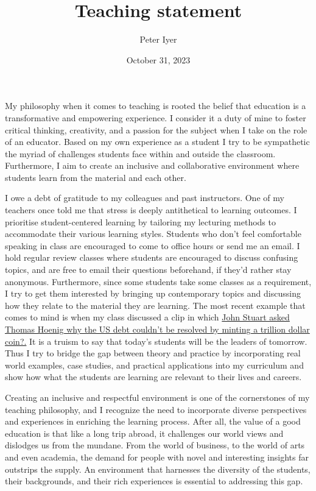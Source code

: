 \documentclass[
]{article}
\title{Teaching statement}
\author{Peter Iyer}
\date{October 31, 2023}
\begin{document}
\maketitle

My philosophy when it comes
to teaching is rooted the belief that education is a transformative and
empowering experience. I consider it a duty of mine to foster critical
thinking, creativity, and a passion for the subject when I take on the
role of an educator. Based on my own experience as a student I try to be
sympathetic the myriad of challenges students face within and outside
the classroom. Furthermore, I aim to create an inclusive and
collaborative environment where students learn from the material and
each other.

I owe a debt of gratitude to my colleagues and past instructors. One of
my teachers once told me that stress is deeply antithetical to learning
outcomes. I prioritise student-centered learning by tailoring my
lecturing methods to accommodate their various learning styles. Students
who don't feel comfortable speaking in class are encouraged to come to
office hours or send me an email. I hold regular review classes where
students are encouraged to discuss confusing topics, and are free to
email their questions beforehand, if they'd rather stay anonymous.
Furthermore, since some students take some classes as a requirement, I
try to get them interested by bringing up contemporary topics and
discussing how they relate to the material they are learning. The most
recent example that comes to mind is when my class discussed a clip in
which
\href{https://www.youtube.com/watch?v=psSYiidw-v0&pp=ygURam9obiBzdGV3YXJ0IGRlYnQ\%3D}{John
Stuart asked Thomas Hoenig why the US debt couldn't be resolved by
minting a trillion dollar coin?.} It is a truism to say that today's
students will be the leaders of tomorrow. Thus I try to bridge the gap
between theory and practice by incorporating real world examples, case
studies, and practical applications into my curriculum and show how what
the students are learning are relevant to their lives and careers.

Creating an inclusive and respectful environment is one of the
cornerstones of my teaching philosophy, and I recognize the need to
incorporate diverse perspectives and experiences in enriching the
learning process. After all, the value of a good education is that like
a long trip abroad, it challenges our world views and dislodges us from
the mundane. From the world of business, to the world of arts and even
academia, the demand for people with novel and interesting insights far
outstrips the supply. An environment that harnesses the diversity of the
students, their backgrounds, and their rich experiences is essential to
addressing this gap.
\end{document}
